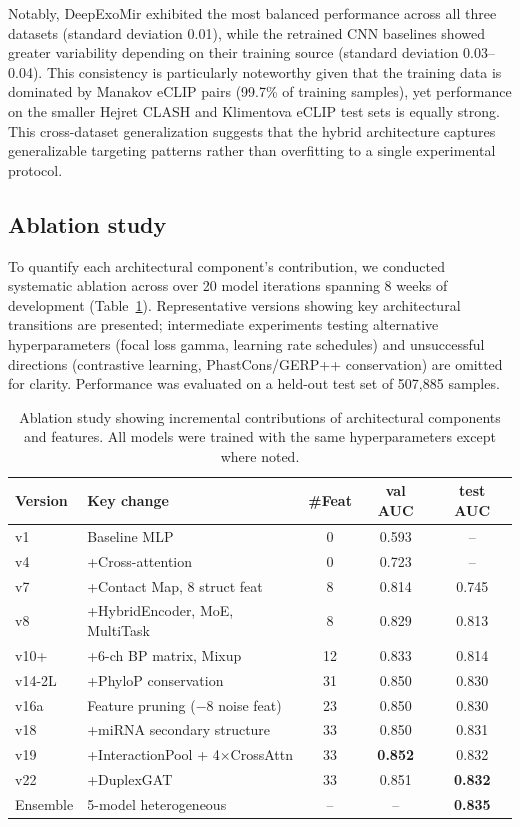 \documentclass[sn-mathphys-num]{sn-jnl}
\begin{document}
Notably, DeepExoMir exhibited the most balanced performance across all three datasets (standard deviation 0.01), while the retrained CNN baselines showed greater variability depending on their training source (standard deviation 0.03--0.04). This consistency is particularly noteworthy given that the training data is dominated by Manakov eCLIP pairs (99.7\% of training samples), yet performance on the smaller Hejret CLASH and Klimentova eCLIP test sets is equally strong. This cross-dataset generalization suggests that the hybrid architecture captures generalizable targeting patterns rather than overfitting to a single experimental protocol.

\subsection{Ablation study}

To quantify each architectural component's contribution, we conducted systematic ablation across over 20 model iterations spanning 8 weeks of development (Table~\ref{tab:ablation}). Representative versions showing key architectural transitions are presented; intermediate experiments testing alternative hyperparameters (focal loss gamma, learning rate schedules) and unsuccessful directions (contrastive learning, PhastCons/GERP++ conservation) are omitted for clarity. Performance was evaluated on a held-out test set of 507,885 samples.

\begin{table}[!t]
\caption{Ablation study showing incremental contributions of architectural components and features. All models were trained with the same hyperparameters except where noted.}\label{tab:ablation}
\begin{tabular}{@{}llccc@{}}
\toprule
Version & Key change & \#Feat & val AUC & test AUC \\
\midrule
v1 & Baseline MLP & 0 & 0.593 & -- \\
v4 & +Cross-attention & 0 & 0.723 & -- \\
v7 & +Contact Map, 8 struct feat & 8 & 0.814 & 0.745 \\
v8 & +HybridEncoder, MoE, MultiTask & 8 & 0.829 & 0.813 \\
v10+ & +6-ch BP matrix, Mixup & 12 & 0.833 & 0.814 \\
v14-2L & +PhyloP conservation & 31 & 0.850 & 0.830 \\
v16a & Feature pruning ($-$8 noise feat) & 23 & 0.850 & 0.830 \\
v18 & +miRNA secondary structure & 33 & 0.850 & 0.831 \\
v19 & +InteractionPool + 4$\times$CrossAttn & 33 & \textbf{0.852} & 0.832 \\
v22 & +DuplexGAT & 33 & 0.851 & \textbf{0.832} \\
\midrule
Ensemble & 5-model heterogeneous & -- & -- & \textbf{0.835} \\
\bottomrule
\end{tabular}
\end{table}
\end{document}
